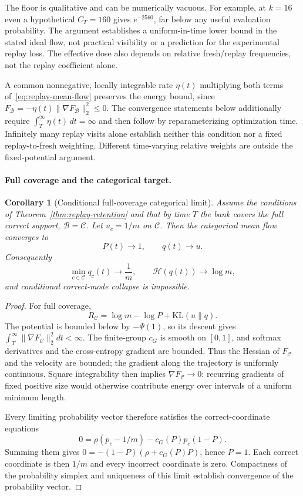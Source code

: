 \documentclass{article}
\newcommand{\1}{\mathbf 1}
\newtheorem{corollary}[lemma]{Corollary}
\theoremstyle{remark}
\theoremstyle{definition}
\theoremstyle{plain}
\begin{document}
The floor is qualitative and can be numerically vacuous. For example, at
$k=16$ even a hypothetical $C_T=160$ gives $e^{-2560}$, far below any useful
evaluation probability. The argument establishes a uniform-in-time lower
bound in the stated ideal flow, not practical visibility or a prediction for
the experimental replay loss. The effective dose also depends on relative
fresh/replay frequencies, not the replay coefficient alone.

A common nonnegative, locally integrable rate $\eta(t)$ multiplying both
terms of~\eqref{eq:replay-mean-flow} preserves the energy bound, since
$\dot F_{\mathcal B}=-\eta(t)\|\nabla F_{\mathcal B}\|_2^2\le0$.
The convergence statements below additionally require
$\int_T^\infty\eta(t)\,dt=\infty$ and then follow by reparameterizing
optimization time. Infinitely many replay visits alone establish neither
this condition nor a fixed replay-to-fresh weighting. Different time-varying
relative weights are outside the fixed-potential argument.

\paragraph{Full coverage and the categorical target.}
\begin{corollary}[Conditional full-coverage categorical limit]
\label{cor:replay-no-collapse}
Assume the conditions of Theorem~\ref{thm:replay-retention} and that by time
$T$ the bank covers the full correct support, $\mathcal B=\mathcal C$. Let
$u_c=1/m$ on $\mathcal C$. Then the categorical mean flow converges to
\[
  P(t)\longrightarrow1,
  \qquad q(t)\longrightarrow u.
\]
Consequently
\[
  \min_{c\in\mathcal C}q_c(t)\longrightarrow\frac1m,
  \qquad
  \mathcal H(q(t))\longrightarrow\log m,
\]
and conditional correct-mode collapse is impossible.
\end{corollary}

\begin{proof}
For full coverage,
\begin{equation}
 R_{\mathcal C}=\log m-\log P+\mathrm{KL}(u\|q).
 \label{eq:replay-mass-uniformity-decomposition}
\end{equation}
The potential is bounded below by $-\Psi(1)$, so its descent gives
$\int_T^\infty\|\nabla F_{\mathcal C}\|_2^2dt<\infty$. The finite-group
$c_G$ is smooth on $[0,1]$, and softmax derivatives and the cross-entropy
gradient are bounded. Thus the Hessian of $F_{\mathcal C}$ and the velocity
are bounded; the gradient along the trajectory is uniformly continuous.
Square integrability then implies $\nabla F_{\mathcal C}\to0$: recurring
gradients of fixed positive size would otherwise contribute energy over
intervals of a uniform minimum length.

Every limiting probability vector therefore satisfies the correct-coordinate
equations
\[
 0=\rho(p_c-1/m)-c_G(P)p_c(1-P).
\]
Summing them gives $0=-(1-P)(\rho+c_G(P)P)$, hence $P=1$. Each correct
coordinate is then $1/m$ and every incorrect coordinate is zero. Compactness
of the probability simplex and uniqueness of this limit establish convergence
of the probability vector.
\end{proof}
\end{document}

